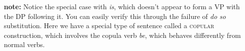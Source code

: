 \documentclass[a4paper,12pt]{article}
\begin{document}
\begin{enumerate}
\begin{enumerate}
         \textbf{note:} Notice the special case with \textit{is}, which doesn't appear to form a VP with the DP following it. You can easily verify this through the failure of \textit{do so} substitution. Here we have a special type of sentence called a \textsc{copular} construction, which involves the copula verb \textit{be}, which behaves differently from normal verbs.
      \end{enumerate}

\end{enumerate}
\end{document}
